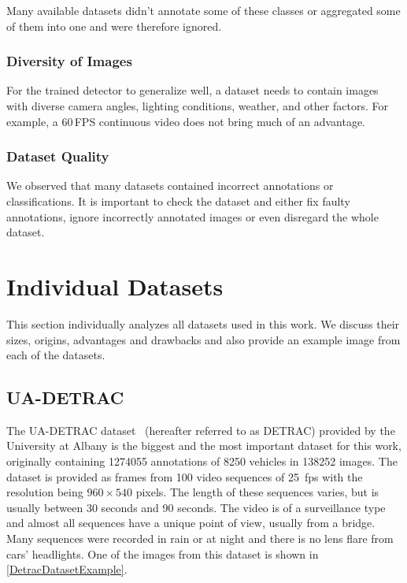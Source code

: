Many available datasets didn't annotate some of these classes or aggregated some of them into one
and were therefore ignored.

\subsubsection*{Diversity of Images}

For the trained detector to generalize well, a dataset needs to
contain images with diverse camera angles, lighting conditions, weather, and
other factors. For example, a 60\,FPS continuous video does not bring much of an
advantage.

\subsubsection*{Dataset Quality}

We observed that many datasets contained incorrect annotations or
classifications. It is important to check the dataset and either fix faulty
annotations, ignore incorrectly annotated images or even disregard the whole
dataset.



\section{Individual Datasets}


This section individually analyzes all datasets used in this work. We discuss
their sizes, origins, advantages and drawbacks and also provide an example image
from each of the datasets.


\subsection{UA-DETRAC}
\label{DetracDataset}

The UA-DETRAC dataset~\cite{detrac} (hereafter referred to as DETRAC) provided by the University at Albany is the
biggest and the most important dataset for this work, originally containing
\num{1274055} annotations of \num{8250} vehicles in \num{138252} images. The
dataset is provided as frames from 100 video sequences of \SI{25}{fps} with the
resolution being $960 \times 540$ pixels. The length of these sequences varies,
but is usually between 30 seconds and 90 seconds. The video is of a surveillance
type and almost all sequences have a unique point of view, usually from a
bridge. Many sequences were recorded in rain or at night and there is no lens
flare from cars' headlights. One of the images from this dataset is shown in
\autoref{DetracDatasetExample}.

